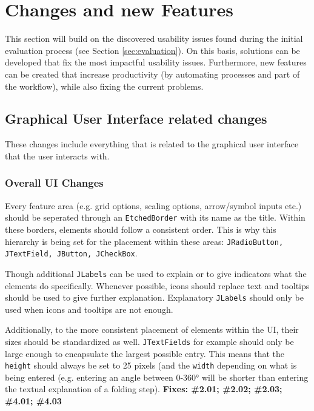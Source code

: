 
\section{Changes and new Features}
\label{sec:solutions}

This section will build on the discovered usability issues found during the initial evaluation process (see Section \ref{sec:evaluation}). On this basis, solutions can be developed that fix the most impactful usability issues. Furthermore, new features can be created that increase productivity (by automating processes and part of the workflow), while also fixing the current problems.


\subsection{Graphical User Interface related changes}

These changes include everything that is related to the graphical user interface that the user interacts with.

\subsubsection{Overall UI Changes}
Every feature area (e.g. grid options, scaling options, arrow/symbol inputs etc.) should be seperated through an \texttt{EtchedBorder} with its name as the title. Within these borders, elements should follow a consistent order. This is why this hierarchy is being set for the placement within these areas: \texttt{JRadioButton, JTextField, JButton, JCheckBox}.

Though additional \texttt{JLabels} can be used to explain or to give indicators what the elements do specifically. Whenever possible, icons should replace text and tooltips should be used to give further explanation. Explanatory \texttt{JLabels} should only be used when icons and tooltips are not enough.

Additionally, to the more consistent placement of elements within the UI, their sizes should be standardized as well. \texttt{JTextFields} for example should only be large enough to encapsulate the largest possible entry. This means that the \texttt{height} should always be set to 25 pixels (and the \texttt{width} depending on what is being entered (e.g. entering an angle between 0-360° will be shorter than entering the textual explanation of a folding step).
\newline
\textbf{Fixes: \#2.01; \#2.02; \#2.03; \#4.01; \#4.03}\\

